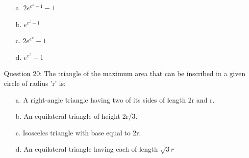 \documentclass[journal]{IEEEtran}
\begin{document}
\begin{enumerate}
    \item [a.] $2e^{e^x-1}-1$
    \item [b.] $e^{e^x-1}$
    \item [c.] $2e^{e^x}-1$
    \item [d.] $e^{e^x}-1$
\end{enumerate}
Question 20: The triangle of the maximum area that can be inscribed in a given circle of radius 'r' is:
\begin{enumerate}
    \item [a.] A right-angle triangle having two of its sides of length 2r and r.
    \item [b.] An equilateral triangle of height 2r/3.
    \item [c.] Isosceles triangle with base equal to 2r.
    \item [d.] An equilateral triangle having each of length $\sqrt{3}r$
\end{enumerate}
\end{document}
